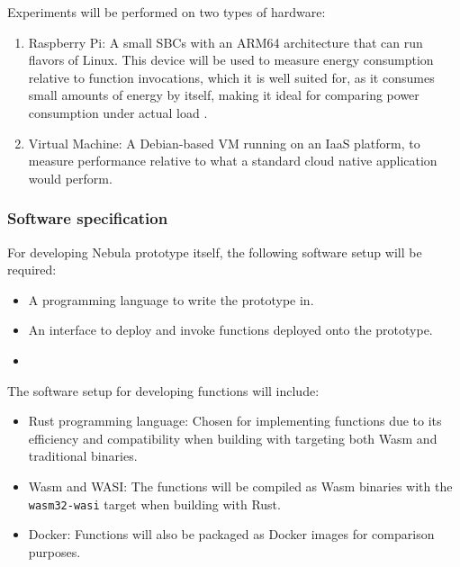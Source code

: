 \documentclass[
  table]{report}
\providecommand{\tightlist}{%
  \setlength{\itemsep}{0pt}\setlength{\parskip}{0pt}}
\begin{document}
Experiments will be performed on two types of hardware:

\begin{enumerate}
\def\labelenumi{\arabic{enumi}.}
\item
  Raspberry Pi: A small \ac{SBC}s with an ARM64 architecture that can
  run flavors of Linux. This device will be used to measure energy
  consumption relative to function invocations, which it is well suited
  for, as it consumes small amounts of energy by itself, making it ideal
  for comparing power consumption under actual load
  \citep{bekarooPowerConsumptionRaspberry2016}.
\item
  Virtual Machine: A Debian-based VM running on an \ac{IaaS} platform,
  to measure performance relative to what a standard cloud native
  application would perform.
\end{enumerate}

\subsubsection{Software specification}


For developing Nebula prototype itself, the following software setup
will be required:

\begin{itemize}
\tightlist
\item
  A programming language to write the prototype in.
\item
  An interface to deploy and invoke functions deployed onto the
  prototype.
\item
\end{itemize}

The software setup for developing functions will include:

\begin{itemize}
\tightlist
\item
  Rust programming language: Chosen for implementing functions due to
  its efficiency and compatibility when building with targeting both
  \ac{Wasm} and traditional binaries.
\item
  \ac{Wasm} and \ac{WASI}: The functions will be compiled as \ac{Wasm}
  binaries with the \texttt{wasm32-wasi} target when building with Rust.
\item
  Docker: Functions will also be packaged as Docker images for
  comparison purposes.
\end{itemize}
\end{document}
